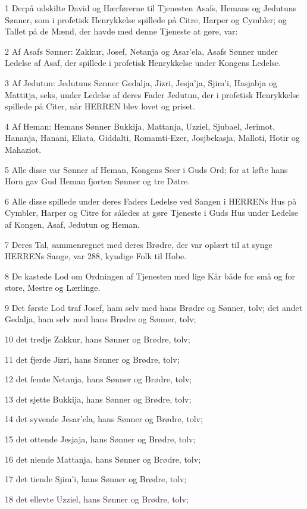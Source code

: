 \par 1 Derpå udskilte David og Hærførerne til Tjenesten Asafs, Hemans og Jedutuns Sønner, som i profetisk Henrykkelse spillede på Citre, Harper og Cymbler; og Tallet på de Mænd, der havde med denne Tjeneste at gøre, var:
\par 2 Af Asafs Sønner: Zakkur, Josef, Netanja og Asar'ela, Asafs Sønner under Ledelse af Asaf, der spillede i profetisk Henrykkelse under Kongens Ledelse.
\par 3 Af Jedutun: Jedutuns Sønner Gedalja, Jizri, Jesja'ja, Sjim'i, Hasjabja og Mattitja, seks, under Ledelse af deres Fader Jedutun, der i profetisk Henrykkelse spillede på Citer, når HERREN blev lovet og priset.
\par 4 Af Heman: Hemans Sønner Bukkija, Mattanja, Uzziel, Sjubael, Jerimot, Hananja, Hanani, Eliata, Giddalti, Romamti-Ezer, Josjbekasja, Malloti, Hotir og Mahaziot.
\par 5 Alle disse var Sønner af Heman, Kongens Seer i Guds Ord; for at løfte hans Horn gav Gud Heman fjorten Sønner og tre Døtre.
\par 6 Alle disse spillede under deres Faders Ledelse ved Sangen i HERRENs Hus på Cymbler, Harper og Citre for således at gøre Tjeneste i Guds Hus under Ledelse af Kongen, Asaf, Jedutun og Heman.
\par 7 Deres Tal, sammenregnet med deres Brødre, der var oplært til at synge HERRENs Sange, var 288, kyndige Folk til Hobe.
\par 8 De kastede Lod om Ordningen af Tjenesten med lige Kår både for små og for store, Mestre og Lærlinge.
\par 9 Det første Lod traf Josef, ham selv med hans Brødre og Sønner, tolv; det andet Gedalja, ham selv med hans Brødre og Sønner, tolv;
\par 10 det tredje Zakkur, hans Sønner og Brødre, tolv;
\par 11 det fjerde Jizri, hans Sønner og Brødre, tolv;
\par 12 det femte Netanja, hans Sønner og Brødre, tolv;
\par 13 det sjette Bukkija, hans Sønner og Brødre, tolv;
\par 14 det syvende Jesar'ela, hans Sønner og Brødre, tolv;
\par 15 det ottende Jesjaja, hans Sønner og Brødre, tolv;
\par 16 det niende Mattanja, hans Sønner og Brødre, tolv;
\par 17 det tiende Sjim'i, hans Sønner og Brødre, tolv;
\par 18 det ellevte Uzziel, hans Sønner og Brødre, tolv;

